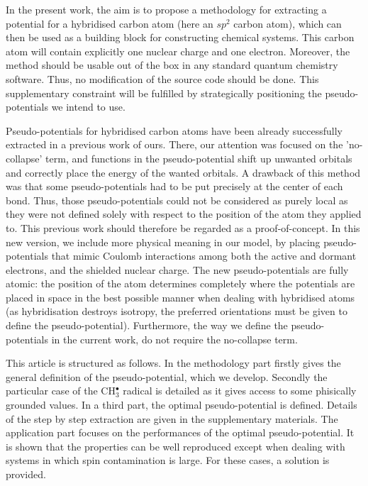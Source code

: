 \documentclass[aip]{revtex4-1}
\begin{document}

In the present work, the aim is 
to propose a methodology for extracting a potential for
a hybridised carbon atom (here an $sp^2$ carbon atom), which can then be
used as a building block for constructing chemical systems. This carbon atom
will contain explicitly one nuclear charge and one electron.
Moreover, the method should be usable 
out of the box in any standard quantum chemistry software.
Thus, no modification of the source code should be done.
This supplementary constraint will be fulfilled by strategically positioning the pseudo-potentials
we intend to use. 

Pseudo-potentials for hybridised carbon
atoms have been already successfully extracted in a previous work of ours.\cite{drujon_pseudopotentials_2013}
There, our attention was focused on the 'no-collapse' term, and 
functions in the pseudo-potential shift up unwanted orbitals and correctly place the energy of the
wanted orbitals.
A drawback of this method was that some pseudo-potentials had to be put precisely at the center
of each bond.
Thus, those pseudo-potentials could not be considered as purely local as they were not defined solely
with respect to the position of the atom they applied to.
This previous work should therefore be regarded as a proof-of-concept.
In this new version, we include more physical meaning in our model, 
by placing pseudo-potentials that mimic Coulomb interactions among both the active and dormant electrons, and the shielded nuclear charge. 
The new pseudo-potentials are fully atomic: the position of the atom
determines completely where the potentials are placed in space in the best possible manner
when dealing with hybridised atoms (as hybridisation destroys isotropy, the preferred orientations
must be given to define the pseudo-potential).
Furthermore, the way we define the pseudo-potentials in the current work, do not require
the no-collapse term.

This article is structured as follows.
In the methodology part firstly gives the general definition of the pseudo-potential, which
we develop.
Secondly the particular case of the CH$_3^\bullet$ radical is detailed as it gives access
to some phisically grounded values.
In a third part, the optimal pseudo-potential is defined. Details of the step by step extraction
are given in the supplementary materials.
The application part focuses on the performances of the optimal pseudo-potential.
It is shown that the properties can be well reproduced except when dealing with
systems in which spin contamination is large.
For these cases, a solution is provided.
\end{document}
